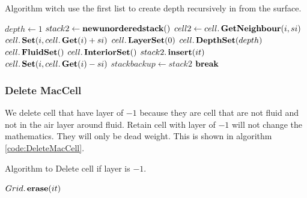		\begin{algorithm}
\caption{Algorithm witch use the first list to create depth recursively in from the surface.}
\label{code:CreateInteriorDepth3}
\begin{algorithmic}[1]
		\State $depth\gets 1$
		\Loop
			\State $stack2 \gets \mathop{\textbf{newunorderedstack}}()$ 
						\State $cell2 \gets cell.\mathop{\textbf{GetNeighbour}}(i,si)$
							\State $cell.\mathop{\textbf{Set}}(i,cell.\mathop{\textbf{Get}}(i)+si)$
							\State $cell.\mathop{\textbf{LayerSet}}(0)$
							\State $cell.\mathop{\textbf{DepthSet}}(depth)$
								\State $cell.\mathop{\textbf{FluidSet}}()$
							\Else
								\State $cell.\mathop{\textbf{InteriorSet}}()$ 
							\EndIf
							\State $stack2.\mathop{\textbf{insert}}(it)$ 
							\State $cell.\mathop{\textbf{Set}}(i,cell.\mathop{\textbf{Get}}(i)-si)$
						\EndIf
					\EndFor
				\EndFor
			\EndFor
			\State $stackbackup\gets stack2$ 
			 
				\State $\mathop{\textbf{break}}$
			\EndIf
		\EndLoop
	\EndProcedure
\end{algorithmic}
\end{algorithm}

\subsubsection{Delete MacCell}

We delete cell that have layer of $-1$ because they are cell that are not fluid and not in the air layer around fluid.
Retain cell with layer of $-1$ will not change the mathematics. They will only be dead weight.
This is shown in algorithm \ref{code:DeleteMacCell}.
\begin{algorithm}
\caption{Algorithm to Delete cell if layer is $-1$.}
\label{code:DeleteMacCell}
\begin{algorithmic}[1]
			\State $Grid.\mathop{\textbf{erase}}(it)$
		\EndIf
	\EndFor
\EndProcedure
\end{algorithmic}
\end{algorithm}


